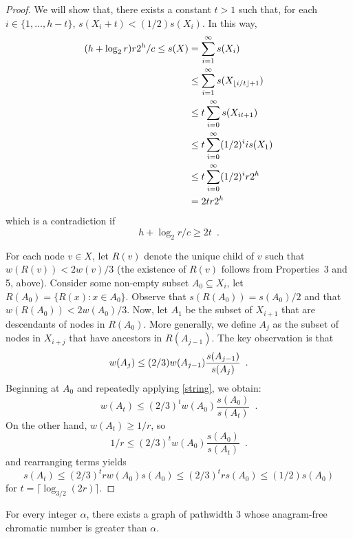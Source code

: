 \documentclass{patmorin}
\begin{document}
\begin{proof}
  We will show that, there exists a constant $t>1$ such that, 
  for each $i\in\{1,\ldots,h-t\}$,  $s(X_i+t) < (1/2)s(X_i)$.  In this way, 
  \begin{align*}
     (h+\log_2 r)r2^{h}/c 
        \le s(X) & = \sum_{i=1}^{\infty} s(X_i) \\
           &\le \sum_{i=1}^{\infty} s(X_{{\lfloor i/t \rfloor}+1}) \\
           &\le t\sum_{i=0}^{\infty} s(X_{it+1}) \\
           &\le t\sum_{i=0}^{\infty} (1/2)^ii s(X_1) \\
           &\le t\sum_{i=0}^{\infty} (1/2)^i r2^{h} \\
           & = 2tr2^{h} 
  \end{align*}
  which is a contradiction if 
  \[    h+\log_2 r/c \ge 2t \enspace . \]

  For each node $v\in X$, let $R(v)$ denote the unique child of $v$
  such that $w(R(v)) < 2w(v)/3$ (the existence of $R(v)$ follows
  from Properties~3 and 5, above).  Consider some non-empty subset
  $A_0\subseteq X_i$, let $R(A_0)=\{R(x):x\in A_0\}$.  Observe that
  $s(R(A_0)) = s(A_0)/2$ and that $w(R(A_0)) < 2w(A_0)/3$.  Now, let $A_1$
  be the subset of $X_{i+1}$ that are descendants of nodes in $R(A_0)$.
  More generally, we define $A_j$ as the subset of nodes in $X_{i+j}$
  that have ancestors in $R(A_{j-1})$.  The key observation is that
  \begin{equation}
      w(A_j) \le (2/3)w(A_{j-1})\frac{s(A_{j-1})}{s(A_j)} \enspace .
        \eqlabel{string}
  \end{equation}
  Beginning at $A_0$ and repeatedly applying \eqref{string}, we obtain:
  \[
      w(A_t) \le (2/3)^t w(A_0)\frac{s(A_0)}{s(A_t)} \enspace .
  \]
  On the other hand, $w(A_t)\ge 1/r$, so  
  \[ 
      1/r \le (2/3)^t w(A_0)\frac{s(A_0)}{s(A_t)} \enspace .
  \]
  and rearranging terms yields
  \[
     s(A_t) \le (2/3)^t r w(A_0)s(A_0) \le (2/3)^t r s(A_0) \le (1/2)s(A_0)
  \]
  for $t = \lceil\log_{3/2}(2r)\rceil$.
\end{proof}


\begin{thm}
  For every integer $\alpha$, there exists a graph of pathwidth 3 whose
  anagram-free chromatic number is greater than $\alpha$.
\end{thm}
\end{document}
